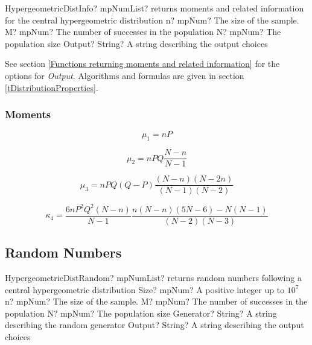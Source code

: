 \begin{mpFunctionsExtract}
	\mpFunctionFour
	{HypergeometricDistInfo? mpNumList? returns moments and related information for the central hypergeometric distribution}
	{n? mpNum? The size of the sample.}
	{M? mpNum? The number of successes in the population}
	{N? mpNum? The population size}
	{Output? String? A string describing the output choices}
\end{mpFunctionsExtract}

\vspace{0.3cm}

See section \ref{Functions returning moments and related information} for the options for {\itshape\sffamily Output}. Algorithms and formulas are given in section \ref{tDistributionProperties}.

\subsubsection{Moments}

\begin{equation} 
	\mu_1 = nP
\end{equation}

\begin{equation} 
	\mu_2 = nPQ \frac{N-n}{N-1}
\end{equation}

\begin{equation} 
	\mu_3 = nPQ (Q-P) \frac{(N-n)(N-2n)}{(N-1)(N-2)}
\end{equation}

\begin{equation} 
	\kappa_4 = \frac{6nP^2Q^2(N-n)}{N-1} \frac{n(N-n)(5N-6)-N(N-1)}{(N-2)(N-3)}
\end{equation}





\subsection{Random Numbers}

\begin{mpFunctionsExtract}
	\mpFunctionSix
	{HypergeometricDistRandom? mpNumList? returns random numbers following a central hypergeometric distribution}
	{Size? mpNum? A positive integer up to $10^7$}
	{n? mpNum? The size of the sample.}
	{M? mpNum? The number of successes in the population}
	{N? mpNum? The population size}
	{Generator? String? A string describing the random generator}
	{Output? String? A string describing the output choices}
\end{mpFunctionsExtract}

